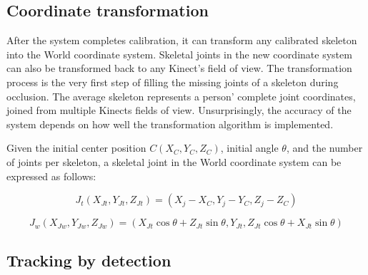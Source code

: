 \documentclass{sigchi}
\begin{document}
\subsection{Coordinate transformation}

After the system completes calibration, it can transform any calibrated skeleton into the World coordinate system. Skeletal joints in the new coordinate system can also be transformed back to any Kinect's field of view. The transformation process is the very first step of filling the missing joints of a skeleton during occlusion. The average skeleton represents a person' complete joint coordinates, joined from multiple Kinects fields of view. Unsurprisingly, the accuracy of the system depends on how well the transformation algorithm is implemented.

Given the initial center position $C(X_C, Y_C, Z_C)$, initial angle $\theta$, and the number of joints per skeleton, a skeletal joint in the World coordinate system can be expressed as follows:

\begin{equation}
\label{eq:joint_translated}
J_t (X_{Jt}, Y_{Jt}, Z_{Jt}) = (X_j - X_C, Y_j - Y_C, Z_j - Z_C)
\end{equation}

\begin{equation}
\label{eq:joint_worldview}
J_w (X_{Jw}, Y_{Jw}, Z_{Jw}) = (X_{Jt}\cos\theta + Z_{Jt}\sin\theta, Y_{Jt}, Z_{Jt}\cos\theta + X_{Jt}\sin\theta)
\end{equation}




\subsection{Tracking by detection}
\end{document}

